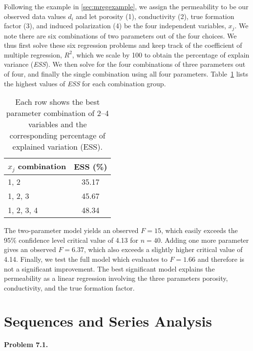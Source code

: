 Following the example in \ref{sec:mregexample}, we assign the permeability to be our observed
data values $d_i$ and let porosity (1), conductivity (2), true formation factor (3), and induced polarization (4) be
the four independent variables, $x_j$. We note there are six combinations of two parameters out of
the four choices.  We thus first solve these six regression problems and keep track of the coefficient of
multiple regression, $R^2$, which we scale by 100 to obtain the percentage of explain variance ({\it ESS}).
We then solve for the four combinations of three parameters out of four, and finally the single
combination using all four parameters.  Table~\ref{tbl:sherwood} lists the highest values of {\it ESS}
for each combination group.
\begin{table}[H]
\center
\begin{tabular}{|l|c|} \hline
$x_j$ combination & \bf{ESS} (\%) \\ \hline
1, 2 & 35.17 \\ \hline
1, 2, 3 & 45.67 \\ \hline
1, 2, 3, 4 & 48.34 \\ \hline
\end{tabular}
\caption{Each row shows the best parameter combination of 2--4 variables and the corresponding percentage of
explained variation (ESS).}
\label{tbl:sherwood}
\end{table}
The two-parameter model yields an observed $F = 15$, which easily exceeds the 95\% confidence level critical value of 4.13 for $n = 40$.
Adding one more parameter gives an observed $F = 6.37$, which also exceeds a slightly higher critical
value of 4.14.  Finally, we test the full model which evaluates to $F = 1.66$ and therefore is not a significant
improvement.  The best significant model explains the permeability as a linear regression involving
the three parameters porosity, conductivity, and the true formation factor.

\section{Sequences and Series Analysis}

\noindent
\bf{Problem 7.1.} \\

